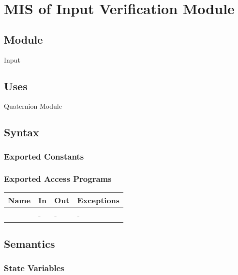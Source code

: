 \documentclass[12pt, titlepage]{article}
\begin{document}
\newpage

\section{MIS of Input Verification Module} \label{ivm}

\subsection{Module}
Input

\subsection{Uses}
Quaternion Module

\subsection{Syntax}

\subsubsection{Exported Constants}

\subsubsection{Exported Access Programs}

\begin{center}
\begin{tabular}{p{2cm} p{4cm} p{4cm} p{2cm}}
\hline
\textbf{Name} & \textbf{In} & \textbf{Out} & \textbf{Exceptions} \\
\hline
 & - & - & - \\
\hline
\end{tabular}
\end{center}

\subsection{Semantics}

\subsubsection{State Variables}

\end{document}
